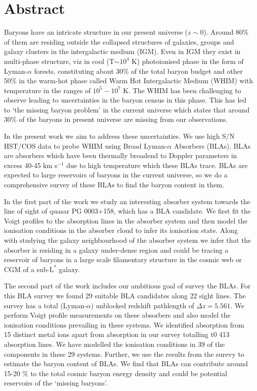 \chapter*{Abstract}

Baryons have an intricate structure in our present universe ($z\sim 0$). Around 80\% of them are residing outside the collapsed structures of galaxies, groups and galaxy clusters in the intergalactic medium (IGM). Even in IGM they exist in multi-phase structure, viz in cool (T$\sim10^4$ K) photoionised phase in the form of Lyman-$\alpha$ forests, constituting about 30\% of the total baryon budget and other 50\% in the warm-hot phase called Warm Hot Intergalactic Medium (WHIM) with temperature in the ranges of $10^5-10^7$ K. The WHIM has been challenging to observe leading to uncertainties in the baryon census in this phase. This has led to `the missing baryon problem' in the current universe which states that around 30\% of the baryons in present universe are missing from our observations.

In the present work we aim to address these uncertainties. We use high S/N HST/COS data to probe WHIM using Broad Lyman-$\alpha$ Absorbers (BLAs). BLAs are absorbers which have been thermally broadend to Doppler parameters in excess 40-45 km s$^{-1}$ due to high temperature which these BLAs trace. BLAs are expected to large reservoirs of baryons in the current universe, so we do a comprehensive survey of these BLAs to find the baryon content in them. 

In the first part of the work we study an interesting absorber system towards the line of sight of quasar PG 0003+158, which has a BLA candidate. We first fit the Voigt profiles to the absorption lines in the absorber system and then model the ionisation conditions in the absorber cloud to infer its ionisation state. Along with studying the galaxy neighbourhood of the absorber system we infer that the absorber is residing in a galaxy under-dense region and could be tracing a reservoir of baryons in a large scale filamentary structure in the cosmic web or CGM of a sub-$\text{L}^{*}$ galaxy.

The second part of the work includes our ambitious goal of survey the BLAs. For this BLA survey we found 29 suitable BLA candidates along 22 sight lines. The survey has a total  (Lyman-$\alpha$) unblocked redshift pathlength of $\Delta z = 5.561$. We perform Voigt profile measurements on these absorbers and also model the ionisation conditions prevailing in these systems. We identified absorption from 15 distinct metal ions apart from  absorption in our survey totalling t0 413 absorption lines. We have modelled the ionisation conditions in 39 of the components in these 29 systems. Further, we use the results from the surevy to estimate the baryon content of BLAs. We find that BLAs can contribute around 15-20 \% to the total cosmic baryon energy density and could be potential reservoirs of the  `missing baryons'.
